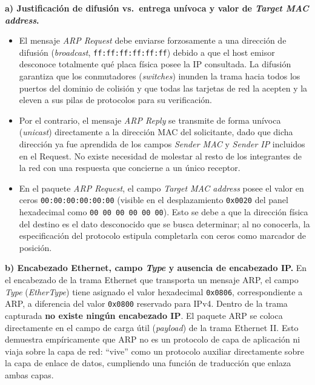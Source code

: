\documentclass[12pt,a4paper]{article}
\begin{document}
\textbf{a) Justificación de difusión vs.\ entrega unívoca y valor de \emph{Target MAC address}.}
\begin{itemize}
    \item El mensaje \emph{ARP Request} debe enviarse forzosamente a una dirección de difusión (\emph{broadcast}, \texttt{ff:ff:ff:ff:ff:ff}) debido a que el host emisor desconoce totalmente qué placa física posee la IP consultada. La difusión garantiza que los conmutadores (\emph{switches}) inunden la trama hacia todos los puertos del dominio de colisión y que todas las tarjetas de red la acepten y la eleven a sus pilas de protocolos para su verificación.
    \item Por el contrario, el mensaje \emph{ARP Reply} se transmite de forma unívoca (\emph{unicast}) directamente a la dirección MAC del solicitante, dado que dicha dirección ya fue aprendida de los campos \emph{Sender MAC} y \emph{Sender IP} incluidos en el Request. No existe necesidad de molestar al resto de los integrantes de la red con una respuesta que concierne a un único receptor.
    \item En el paquete \emph{ARP Request}, el campo \emph{Target MAC address} posee el valor en ceros \texttt{00:00:00:00:00:00} (visible en el desplazamiento \texttt{0x0020} del panel hexadecimal como \texttt{00 00 00 00 00 00}). Esto se debe a que la dirección física del destino es el dato desconocido que se busca determinar; al no conocerla, la especificación del protocolo estipula completarla con ceros como marcador de posición.
\end{itemize}

\textbf{b) Encabezado Ethernet, campo \emph{Type} y ausencia de encabezado IP.}
En el encabezado de la trama Ethernet que transporta un mensaje ARP, el campo \emph{Type} (\emph{EtherType}) tiene asignado el valor hexadecimal \texttt{0x0806}, correspondiente a ARP, a diferencia del valor \texttt{0x0800} reservado para IPv4.
Dentro de la trama capturada \textbf{no existe ningún encabezado IP}. El paquete ARP se coloca directamente en el campo de carga útil (\emph{payload}) de la trama Ethernet II. Esto demuestra empíricamente que ARP no es un protocolo de capa de aplicación ni viaja sobre la capa de red: ``vive'' como un protocolo auxiliar directamente sobre la capa de enlace de datos, cumpliendo una función de traducción que enlaza ambas capas.
\end{document}
